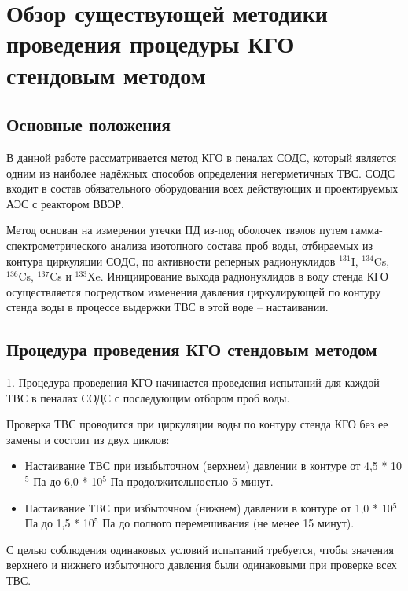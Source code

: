
\section{Обзор существующей методики проведения процедуры КГО стендовым методом}

\subsection{Основные положения}

В данной работе рассматривается метод КГО в пеналах СОДС\cite{RD}, который является одним из наиболее надёжных способов определения негерметичных ТВС. СОДС входит в состав обязательного оборудования всех действующих и проектируемых АЭС с реактором ВВЭР.

Метод основан на измерении утечки ПД из-под оболочек твэлов путем гамма-спектрометрического анализа изотопного состава проб воды, отбираемых из контура циркуляции СОДС, по активности реперных радионуклидов $^{131}$I, $^{134}$Cs, $^{136}$Cs, $^{137}$Cs и $^{133}$Xe. Инициирование выхода радионуклидов в воду стенда КГО осуществляется посредством изменения давления циркулирующей по контуру стенда воды в процессе выдержки ТВС в этой воде -- настаивании.

\subsection{Процедура проведения КГО стендовым методом}
1. Процедура проведения КГО начинается проведения испытаний для каждой ТВС в пеналах СОДС с последующим отбором проб воды. 

Проверка ТВС проводится при циркуляции воды по контуру стенда КГО без ее замены и состоит из двух циклов:
\begin{itemize}
\item Настаивание ТВС при изыбыточном (верхнем) давлении в контуре от 4,5 * 10$^{5}$ Па до 6,0 * 10$^{5}$ Па продолжительностью 5 минут.

\item Настаивание ТВС при избыточном (нижнем) давлении в контуре от 1,0 * 10$^{5}$ Па до 1,5 * 10$^{5}$ Па до полного перемешивания (не менее 15 минут).
\end{itemize}

С целью соблюдения одинаковых условий испытаний требуется, чтобы значения верхнего и нижнего избыточного давления были одинаковыми при проверке всех ТВС. 

